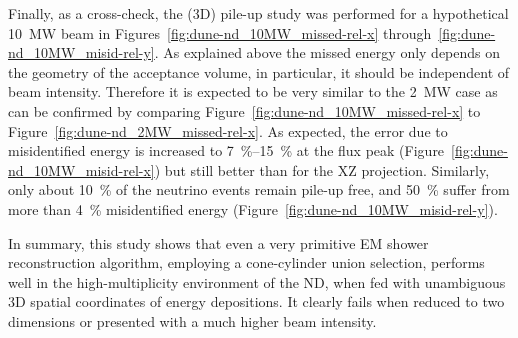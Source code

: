 Finally, as a cross-check, the (3D) pile-up study was performed for a hypothetical \SI{10}{\mega\watt} beam in Figures~\ref{fig:dune-nd_10MW_missed-rel-x} through~\ref{fig:dune-nd_10MW_misid-rel-y}.
As explained above the missed energy only depends on the geometry of the acceptance volume, in particular, it should be independent of beam intensity.
Therefore it is expected to be very similar to the \SI{2}{\mega\watt} case as can be confirmed by comparing Figure~\ref{fig:dune-nd_10MW_missed-rel-x} to Figure~\ref{fig:dune-nd_2MW_missed-rel-x}.
As expected, the error due to misidentified energy is increased to \SIrange{7}{15}{\percent} at the flux peak (Figure~\ref{fig:dune-nd_10MW_misid-rel-x}) but still better than for the XZ projection.
Similarly, only about \SI{10}{\percent} of the neutrino events remain pile-up free, and \SI{50}{\percent} suffer from more than \SI{4}{\percent} misidentified energy (Figure~\ref{fig:dune-nd_10MW_misid-rel-y}).

In summary, this study shows that even a very primitive EM shower reconstruction algorithm, employing a cone-cylinder union selection, performs well in the high-multiplicity environment of the \dune{} ND, when fed with unambiguous 3D spatial coordinates of energy depositions.
It clearly fails when reduced to two dimensions or presented with a much higher beam intensity.